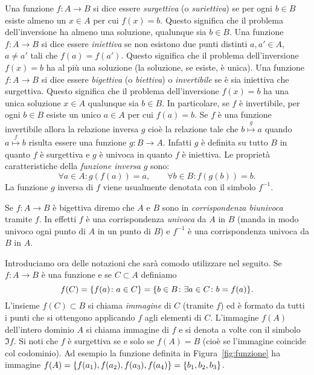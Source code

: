 Una funzione $f\colon A \to B$ si dice essere \emph{surgettiva}%
%
 (o \emph{suriettiva})
se per ogni $b\in B$ esiste almeno un $x\in A$ per cui $f(x)=b$. Questo
significa che il problema dell'inversione ha almeno una soluzione, qualunque
sia $b\in B$.
Una funzione $f\colon A \to B$ si dice essere \emph{iniettiva}%
%
se non esistono due punti distinti $a,a' \in A$, $a\neq a'$ tali
che $f(a) = f(a')$. Questo significa che il problema dell'inversione
$f(x)=b$ ha al più una soluzione (la soluzione, se esiste, è unica).
Una funzione $f\colon A \to B$ si dice essere \emph{bigettiva}%
%
(o \emph{biettiva})
%
%
%
%
%
%
o
\emph{invertibile}%
%
%
se è sia iniettiva che surgettiva. Questo significa
che il problema dell'inversione $f(x)=b$ ha una unica soluzione $x\in A$
qualunque sia $b\in B$. In particolare, se $f$ è invertibile, per ogni $b\in B$ esiste
un unico $a\in A$ per cui $f(a)=b$.
Se $f$ è una funzione invertibile allora la relazione inversa $g$
cioè la relazione tale che $b\stackrel g \mapsto a$ quando $a \stackrel f \mapsto b$
risulta essere una funzione $g\colon B\to A$. 
Infatti $g$ è definita su tutto $B$ in quanto $f$ è surgettiva 
e $g$ è univoca in quanto $f$ è iniettiva.
Le proprietà caratteristiche della \emph{funzione inversa}%
%
 $g$ sono:
\begin{equation}\label{eq:572098}
  \forall a\in A\colon g(f(a)) = a, \qquad
  \forall b\in B\colon f(g(b)) = b.
\end{equation}
La funzione $g$ inversa di $f$ viene usualmente denotata con il simbolo $f^{-1}$.

Se $f\colon A\to B$ è bigettiva diremo che $A$ 
e $B$ sono in \emph{corrispondenza biunivoca}%
%
 tramite $f$.
In effetti $f$ è una corrispondenza \emph{univoca} da $A$ in $B$
(manda in modo univoco ogni punto di $A$ in un punto di $B$)
e $f^{-1}$ è una corrispondenza univoca da $B$ in $A$.

Introduciamo ora delle notazioni che sarà comodo utilizzare nel seguito.
Se $f\colon A \to B$ è una funzione e se $C\subset A$ definiamo
\[
  f(C) 
  = {\left\{ f(a)\colon a \in C \right\}} 
  = {\left\{ b\in B\colon \exists a\in C\colon b=f(a) \right\}}.
\]
L'insieme $f(C)\subset B$ si chiama \emph{immagine}%
%
%
di $C$ (tramite $f$) ed è formato
da tutti i punti che si ottengono applicando $f$ agli elementi di $C$.
L'immagine $f(A)$ dell'intero dominio $A$ si chiama immagine di $f$
e si denota a volte con il simbolo $\Im f$.
Si noti che $f$ è surgettiva se e solo se $f(A)=B$ (cioè se l'immagine coincide
col codominio).
Ad esempio la funzione definita in Figura~\ref{fig:funzione}
ha immagine $f(A) = {\left\{ f(a_1),f(a_2),f(a_3),f(a_4) \right\}} 
 = {\left\{ b_1, b_2, b_3 \right\}}$.

